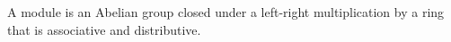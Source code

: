 \begin{definition}[Module]
    A module is an Abelian group closed under a left-right multiplication by a ring that is associative and distributive.
\end{definition}
